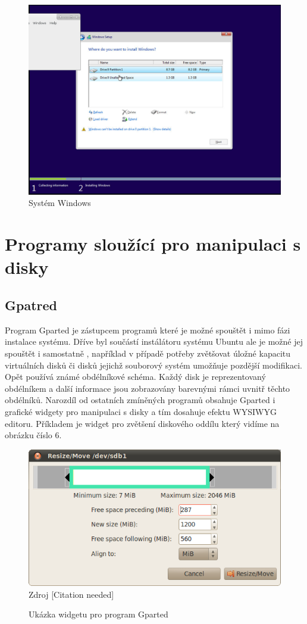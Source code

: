 \documentclass[a4paper]{article}
\begin{document}
\begin{figure}
\label{fig:win}
\caption{Systém Windows}
\centering
\includegraphics[width=.8\columnwidth]{pics/win1.jpg}
\end{figure}

\section{Programy sloužící pro manipulaci s disky}

\subsection{Gpatred}

Program Gparted je zástupcem programů které je možné spouštět i mimo fázi instalace systému. Dříve byl součástí instálátoru systému Ubuntu ale je možné jej spouštět i samostatně , například 
v případě potřeby zvětšovat úložné kapacitu virtuálních disků či disků jejichž souborový systém umožňuje pozdější modifikaci. Opět používá známé obdélníkové schéma. Každý disk je reprezentovaný 
obdélníkem a další informace jsou zobrazovány barevnými rámci uvnitř těchto obdélníků. Narozdíl od ostatních zmíněných programů obsahuje Gparted i grafické widgety pro manipulaci s disky 
a tím dosahuje efektu WYSIWYG editoru. Příkladem je widget pro zvětšení diskového oddílu který vidíme na obrázku číslo 6.

\begin{figure}
\label{fig:gparted}
\caption{Ukázka widgetu pro program Gparted}
\centering
\includegraphics[width=.8\columnwidth]{pics/gparted-5-big.png}\\
\scriptsize Zdroj [Citation needed]
\end{figure}
\end{document}
